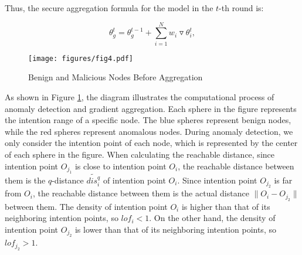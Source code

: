 \documentclass[lettersize,journal]{IEEEtran}
\begin{document}
Thus, the secure aggregation formula for the model in the $t$-th round is:

\begin{equation}
    \theta_g^t = \theta_g^{t-1}+\sum_{i=1}^{N}w_i\triangledown \theta_i^t,
\end{equation}


\begin{figure}[!t]
    \centering
    \texttt{[image: figures/fig4.pdf]}
    \caption{Benign and Malicious Nodes Before Aggregation}
    \label{fig:before-agg}
\end{figure}
As shown in Figure \ref{fig:before-agg}, the diagram illustrates the computational process of anomaly detection and gradient aggregation. Each sphere in the figure represents the intention range of a specific node. The blue spheres represent benign nodes, while the red spheres represent anomalous nodes. During anomaly detection, we only consider the intention point of each node, which is represented by the center of each sphere in the figure. When calculating the reachable distance, since intention point $O_{j_1}$ is close to intention point $O_i$, the reachable distance between them is the $q$-distance $\widetilde{dis_i^q}$ of intention point $O_i$. Since intention point $O_{j_2}$ is far from $O_i$, the reachable distance between them is the actual distance $\|O_i-O_{j_2}\|$ between them. The density of intention point $O_i$ is higher than that of its neighboring intention points, so $lof_i < 1$. On the other hand, the density of intention point $O_{j_2}$ is lower than that of its neighboring intention points, so $lof_{j_2} > 1$.
\end{document}
